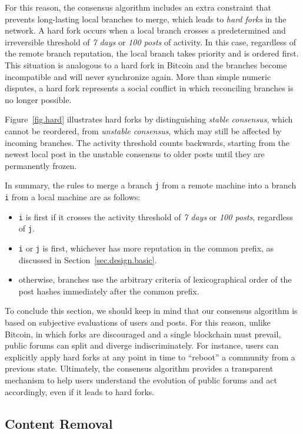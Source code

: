 \documentclass[12pt]{article}
\newcommand{\code}[1]  {\texttt{\footnotesize{#1}}}
\begin{document}
For this reason, the consensus algorithm includes an extra constraint that
prevents long-lasting local branches to merge, which leads to \emph{hard forks}
in the network.
A hard fork occurs when a local branch crosses a predetermined and irreversible
threshold of \emph{7 days} or \emph{100 posts} of activity.
In this case, regardless of the remote branch reputation, the local branch
takes priority and is ordered first.
This situation is analogous to a hard fork in Bitcoin and the branches become
incompatible and will never synchronize again.
More than simple numeric disputes, a hard fork represents a social conflict in
which reconciling branches is no longer possible.

Figure~\ref{fig.hard} illustrates hard forks by distinguishing \emph{stable
consensus}, which cannot be reordered, from \emph{unstable consensus}, which
may still be affected by incoming branches.
The activity threshold counts backwards, starting from the newest local post
in the unstable consensus to older posts until they are permanently frozen.

In summary, the rules to merge a branch \code{j} from a remote machine into a
branch \code{i} from a local machine are as follows:
\begin{itemize}
    \item \code{i} is first if it crosses the activity threshold of
          \emph{7 days} or \emph{100 posts}, regardless of \code{j}.
    \item \code{i} or \code{j} is first, whichever has more reputation in the
          common prefix, as discussed in Section~\ref{sec.design.basic}.
    \item otherwise, branches use the arbitrary criteria of lexicographical
          order of the post hashes immediately after the common prefix.
\end{itemize}

To conclude this section, we should keep in mind that our consensus algorithm
is based on subjective evaluations of users and posts.
For this reason, unlike Bitcoin, in which forks are discouraged and a single
blockchain must prevail, public forums can split and diverge indiscriminately.
For instance, users can explicitly apply hard forks at any point in time to
``reboot'' a community from a previous state.
Ultimately, the consensus algorithm provides a transparent mechanism to help
users understand the evolution of public forums and act accordingly, even if it
leads to hard forks.

\subsection{Content Removal}
\end{document}
